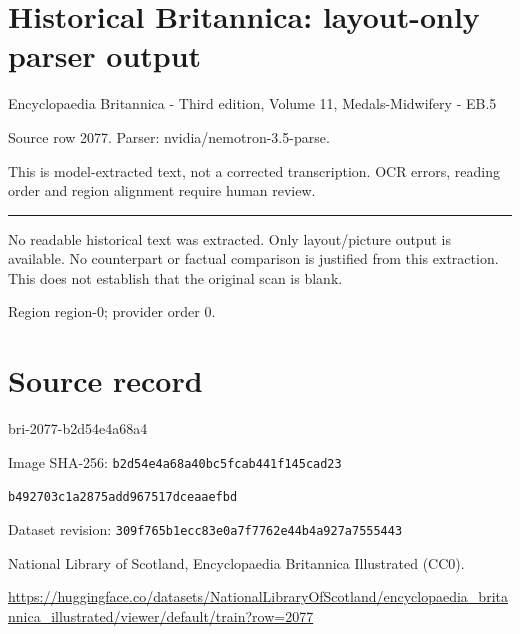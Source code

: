 \documentclass[11pt]{article}
\begin{document}
\section*{Historical Britannica: layout-only parser output}
Encyclopaedia Britannica - Third edition, Volume 11, Medals-Midwifery - EB.5\par
{\small Source row 2077. Parser: nvidia/nemotron-3.5-parse.\par}
{\small This is model-extracted text, not a corrected transcription. OCR errors, reading order and region alignment require human review.\par}
\hrule\medskip
{\color{red} No readable historical text was extracted. Only layout/picture output is available. No counterpart or factual comparison is justified from this extraction. This does not establish that the original scan is blank.\par}


\par

{\scriptsize\color{gray} Region region-0; provider order 0.\par}
\medskip
\newpage\section*{Source record}
bri-2077-b2d54e4a68a4\par
Image SHA-256: \texttt{b2d54e4a68a40bc5fcab441f145cad23}\par\texttt{b492703c1a2875add967517dceaaefbd}\par
Dataset revision: \texttt{309f765b1ecc83e0a7f7}\texttt{762e44b4a927a7555443}\par
National Library of Scotland, Encyclopaedia Britannica Illustrated (CC0).\par
\url{https://huggingface.co/datasets/NationalLibraryOfScotland/encyclopaedia_britannica_illustrated/viewer/default/train?row=2077}
\end{document}
